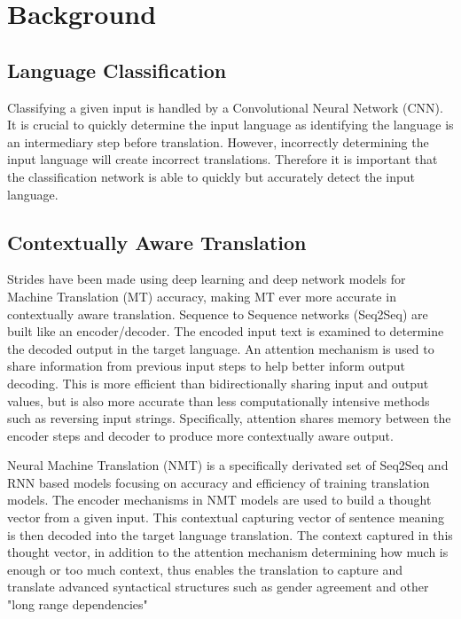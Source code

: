 \documentclass[10pt,a4paper]{article}
\begin{document}
\clearpage

\section{Background}

\subsection{Language Classification}

  Classifying a given input is handled by a Convolutional Neural Network (CNN). It is crucial to quickly determine the input language as identifying the language is an intermediary step before translation. However, incorrectly determining the input language will create incorrect translations. Therefore it is important that the classification network is able to quickly but accurately detect the input language.

\subsection{Contextually Aware Translation}

  Strides have been made using deep learning and deep network models for Machine Translation (MT) accuracy, making MT ever more accurate in contextually aware translation. Sequence to Sequence networks (Seq2Seq) are built like an encoder/decoder. The encoded input text is examined to determine the decoded output in the target language. An attention mechanism is used to share information from previous input steps to help better inform output decoding. This is more efficient than bidirectionally sharing input and output values, but is also more accurate than less computationally intensive methods such as reversing input strings. Specifically, attention shares memory between the encoder steps and decoder to produce more contextually aware output.

  Neural Machine Translation (NMT) is a specifically derivated set of Seq2Seq and RNN based models focusing on accuracy and efficiency of training translation models. The encoder mechanisms in NMT models are used to build a thought vector from a given input. This contextual capturing vector of sentence meaning is then decoded into the target language translation. The context captured in this thought vector, in addition to the attention mechanism determining how much is enough or too much context, thus enables the translation to capture and translate advanced syntactical structures such as gender agreement and other "long range dependencies"
\end{document}
